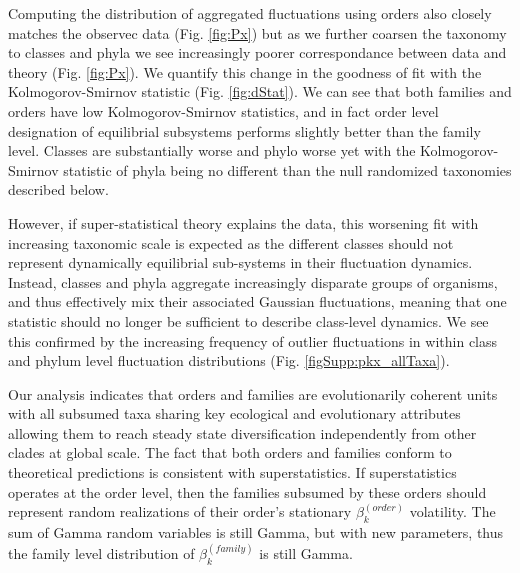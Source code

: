 \documentclass[12pt]{article}
\begin{document}
Computing the distribution of aggregated fluctuations using orders
also closely matches the observec data (Fig. \ref{fig:Px}) but as we
further coarsen the taxonomy to classes and phyla we see increasingly
poorer correspondance between data and theory (Fig. \ref{fig:Px}). We
quantify this change in the goodness of fit with the
Kolmogorov-Smirnov statistic (Fig. \ref{fig:dStat}). We can see that
both families and orders have low Kolmogorov-Smirnov statistics, and
in fact order level designation of equilibrial subsystems performs
slightly better than the family level. Classes are substantially worse
and phylo worse yet with the Kolmogorov-Smirnov statistic of phyla
being no different than the null randomized taxonomies described
below.

However, if super-statistical theory explains the data, this worsening
fit with increasing taxonomic scale is expected as the different
classes should not represent dynamically equilibrial sub-systems in
their fluctuation dynamics. Instead, classes and phyla aggregate
increasingly disparate groups of organisms, and thus effectively mix
their associated Gaussian fluctuations, meaning that one statistic
should no longer be sufficient to describe class-level dynamics. We
see this confirmed by the increasing frequency of outlier fluctuations
in within class and phylum level fluctuation distributions
(Fig. \ref{figSupp:pkx_allTaxa}).

Our analysis indicates that orders and families are evolutionarily
coherent units with all subsumed taxa sharing key ecological
and evolutionary attributes allowing them to reach steady state
diversification independently from other clades at global scale. The
fact that both orders and families conform to theoretical predictions
is consistent with superstatistics. If superstatistics operates at the
order level, then the families subsumed by these orders should
represent random realizations of their order's stationary $\beta_k^{(order)}$
volatility. The sum of Gamma random variables is still Gamma, but with
new parameters, thus the family level distribution of
$\beta_k^{(family)}$ is still Gamma.
\end{document}
